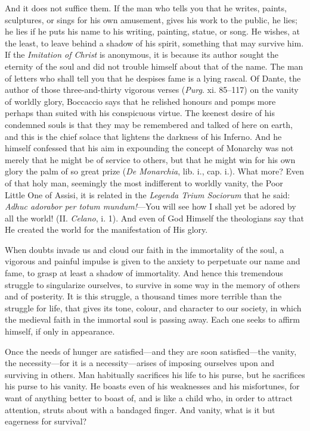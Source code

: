 And it does not suffice them. If the man who tells you that he writes,
paints, sculptures, or sings for his own amusement, gives his work to
the public, he lies; he lies if he puts his name to his writing,
painting, statue, or song. He wishes, at the least, to leave behind a
shadow of his spirit, something that may survive him. If the
\textit{Imitation of Christ} is anonymous, it is because its author
sought the eternity of the soul and did not trouble himself about that
of the name. The man of letters who shall tell you that he despises
fame is a lying rascal.  Of Dante, the author of those
three-and-thirty vigorous verses (\textit{Purg}. xi. 85--117) on the
vanity of worldly glory, Boccaccio says that he relished honours and
pomps more perhaps than suited with his conspicuous virtue. The
keenest desire of his condemned souls is that they may be remembered
and talked of here on earth, and this is the chief solace that
lightens the darkness of his Inferno. And he himself confessed that
his aim in expounding the concept of Monarchy was not merely that he
might be of service to others, but that he might win for his own glory
the palm of so great prize (\textit{De Monarchia}, lib. i., cap. i.).
What more? Even of that holy man, seemingly the most indifferent to
worldly vanity, the Poor Little One of Assisi, it is related in the
\textit{Legenda Trium Sociorum} that he said: \textit{Adhuc adorabor
per totum mundum!}---You will see how I shall yet be adored by all the
world! (II. \textit{Celano}, i. 1). And even of God Himself the
theologians say that He created the world for the manifestation of His
glory.

When doubts invade us and cloud our faith in the immortality of the
soul, a vigorous and painful impulse is given to the anxiety to
perpetuate our name and fame, to grasp at least a shadow of
immortality. And hence this tremendous struggle to singularize
ourselves, to survive in some way in the memory of others and of
posterity. It is this struggle, a thousand times more terrible than
the struggle for life, that gives its tone, colour, and character to
our society, in which the medieval faith in the immortal soul is
passing away. Each one seeks to affirm himself, if only in appearance.

Once the needs of hunger are sat\-is\-fied---and they are soon
sat\-is\-fied---the vanity, the necessity---for it is a
ne\-ces\-si\-ty---a\-ris\-es of imposing ourselves upon and surviving
in others. Man habitually sacrifices his life to his purse, but he
sacrifices his purse to his vanity. He boasts even of his weaknesses
and his misfortunes, for want of anything better to boast of, and is
like a child who, in order  to attract attention, struts
about with a bandaged finger. And vanity, what is it but eagerness for
survival?

